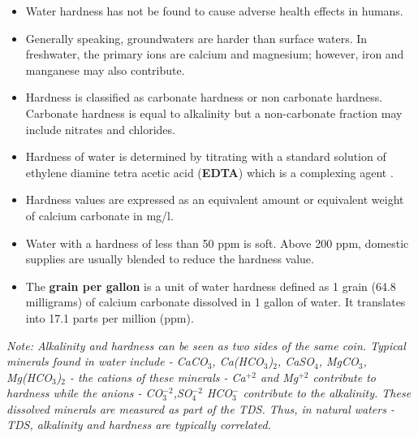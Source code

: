 \begin{itemize}
\item Water hardness has not be found to cause adverse health effects in humans.  
\item Generally speaking, groundwaters are harder than surface waters.  In freshwater, the primary ions are calcium and magnesium; however, iron and manganese may also contribute. 
\item Hardness is classified as carbonate hardness or non carbonate hardness. Carbonate hardness is equal to alkalinity but a non-carbonate fraction may include nitrates and chlorides.
\item Hardness of water is determined by titrating with a standard solution of ethylene diamine tetra acetic acid (\textbf{EDTA})  which is a complexing agent .
\item Hardness values are expressed as an equivalent amount or equivalent weight of calcium carbonate in mg/l. 
\item Water with a hardness of less than 50 ppm is soft. Above 200 ppm, domestic supplies are usually blended to reduce the hardness value.
\item The \textbf{grain per gallon}  is a unit of water hardness defined as 1 grain (64.8 milligrams) of calcium carbonate dissolved in 1 gallon of water. It translates into 17.1 parts per million (ppm).
\end{itemize}
\textit{Note: Alkalinity and hardness can be seen as two sides of the same coin.  Typical minerals found in water include - CaCO$_3$, Ca(HCO$_3$)$_2$, CaSO$_4$, MgCO$_3$, Mg(HCO$_3$)$_2$ - the cations of these minerals - Ca$^{+2}$ and Mg$^{+2}$ contribute to hardness while the anions - CO$_{3}^{-2}$,SO$_{4}^{-2}$ HCO$_{3}^{-}$ contribute to the alkalinity.  These dissolved minerals are measured as part of the TDS.  Thus, in natural waters - TDS, alkalinity and hardness are typically correlated.}




